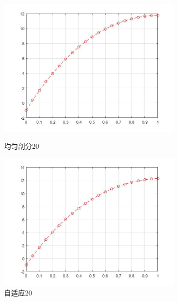 \documentclass[12pt,fontset=mac]{ctexart}
\begin{document}
\begin{figure}[H]
	\centering
	\begin{minipage}[t]{0.48\textwidth}
		\centering
		\includegraphics[width=9cm]{方程三，均匀剖分20.jpg}
		\caption{均匀剖分20}
	\end{minipage}
	\begin{minipage}[t]{0.48\textwidth}
		\centering
		\includegraphics[width=9cm]{方程三，自适应20.jpg}
		\caption{自适应20}
	\end{minipage}
\end{figure}
\end{document}
